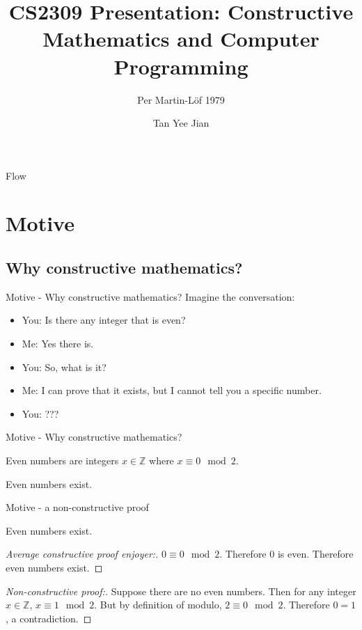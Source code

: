 \documentclass{beamer}
\theoremstyle{plain}
\begin{document}


\begin{frame}
  \title{CS2309 Presentation: Constructive Mathematics and Computer Programming}
  \subtitle{Per Martin-Löf 1979}
  \author{Tan Yee Jian}
  \maketitle
\end{frame}
\begin{frame}{Flow}
  \tableofcontents
\end{frame}
\section{Motive}

\subsection{Why constructive mathematics?}
\begin{frame}{Motive - Why constructive mathematics?}
  Imagine the conversation:
  \begin{itemize}
    \pause
    \item You: Is there any integer that is even?
    \pause
    \item Me: Yes there is.
    \pause
    \item You: So, what is it?
    \pause
    \item Me: I can prove that it exists, but I cannot tell you a specific number.
    \pause
    \item You: ???
  \end{itemize}
\end{frame}

\begin{frame}{Motive - Why constructive mathematics?}
 \begin{definition}
   Even numbers are integers $x\in\mathbb{Z}$ where $x\equiv0\mod 2$.
\end{definition}
  \begin{theorem}
    Even numbers exist.
  \end{theorem}
\end{frame}

\begin{frame}{Motive - a non-constructive proof}
  \begin{theorem}
    Even numbers exist.
  \end{theorem}
  \pause
  \begin{proof}[Average constructive proof enjoyer:]
    $0\equiv0\mod 2$. Therefore $0$ is even. Therefore even numbers exist.
  \end{proof}
  \pause
  \begin{proof}[Non-constructive proof:]
    Suppose there are no even numbers. Then for any integer $x\in\mathbb{Z}$, $x\equiv1\mod 2$.
    But by definition of modulo, $2\equiv0\mod2$. Therefore $0=1$, a contradiction.
  \end{proof}
\end{frame}
\end{document}
